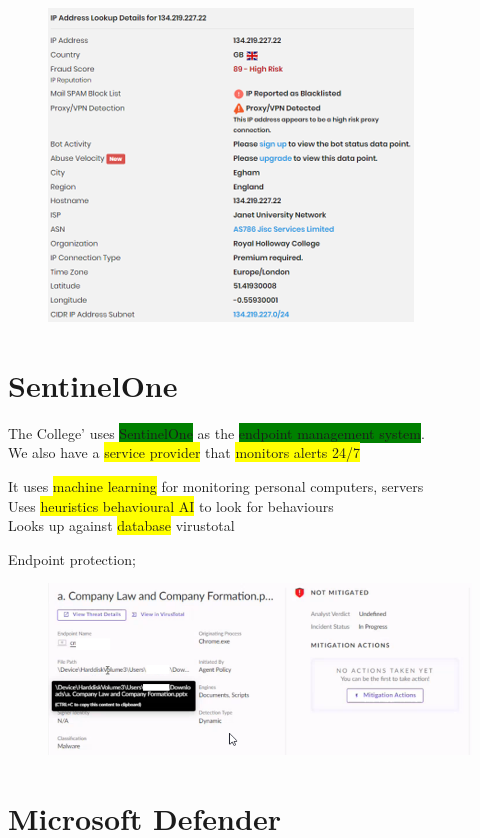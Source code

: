 \documentclass[tikz,border=10pt]{project_plan}
\begin{document}
\begin{figure}[H]
  \centering
  \includegraphics[width=.6\linewidth]{IP quality score.png}
\end{figure}

\section{SentinelOne}

The College’ uses \colorbox{green}{SentinelOne} as the \colorbox{green}{endpoint management system}. \\
We also have a \colorbox{yellow}{service provider} that \colorbox{yellow}{monitors alerts 24/7}

It uses \colorbox{yellow}{machine learning} for monitoring personal computers, servers\\
Uses \colorbox{yellow}{heuristics behavioural AI} to look for behaviours\\
Looks up against \colorbox{yellow}{database} virustotal

Endpoint protection;

\begin{figure}[H]
  \centering
  \includegraphics[width=.6\linewidth]{endpoint protection.png}
\end{figure}

\section{Microsoft Defender}
\end{document}
